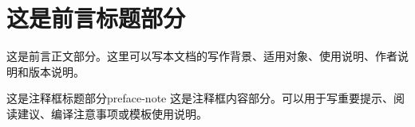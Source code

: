 \chapter{这是前言标题部分}

这是前言正文部分。这里可以写本文档的写作背景、适用对象、使用说明、作者说明和版本说明。

\begin{note}{这是注释框标题部分}{preface-note}
    这是注释框内容部分。可以用于写重要提示、阅读建议、编译注意事项或模板使用说明。
\end{note}

\endinput
